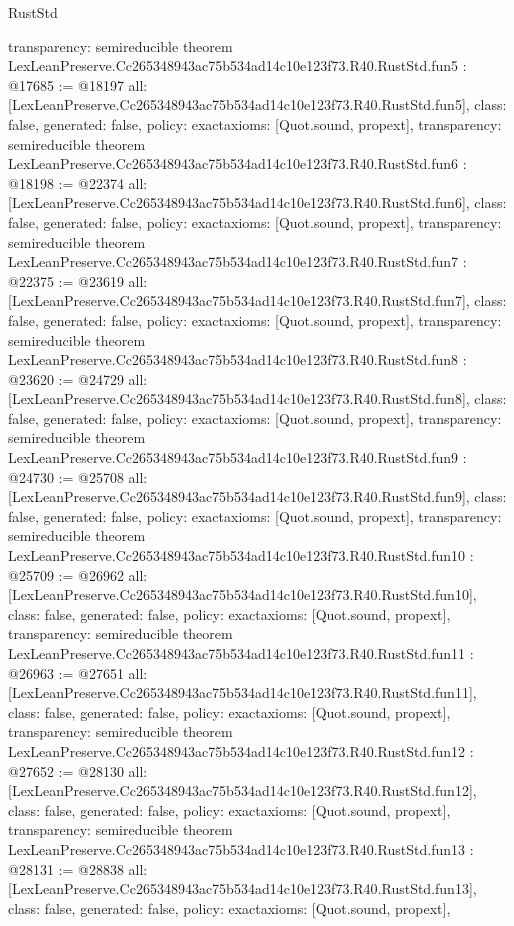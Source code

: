 \begin{lexlean}{RustStd}
\begin{coremodule}
{  transparency: semireducible
}
theorem LexLeanPreserve.Cc265348943ac75b534ad14c10e123f73.R40.RustStd.fun5 : @17685 := @18197 {
  all: [LexLeanPreserve.Cc265348943ac75b534ad14c10e123f73.R40.RustStd.fun5],
  class: false,
  generated: false,
  policy: exact{axioms: [Quot.sound, propext]},
  transparency: semireducible
}
theorem LexLeanPreserve.Cc265348943ac75b534ad14c10e123f73.R40.RustStd.fun6 : @18198 := @22374 {
  all: [LexLeanPreserve.Cc265348943ac75b534ad14c10e123f73.R40.RustStd.fun6],
  class: false,
  generated: false,
  policy: exact{axioms: [Quot.sound, propext]},
  transparency: semireducible
}
theorem LexLeanPreserve.Cc265348943ac75b534ad14c10e123f73.R40.RustStd.fun7 : @22375 := @23619 {
  all: [LexLeanPreserve.Cc265348943ac75b534ad14c10e123f73.R40.RustStd.fun7],
  class: false,
  generated: false,
  policy: exact{axioms: [Quot.sound, propext]},
  transparency: semireducible
}
theorem LexLeanPreserve.Cc265348943ac75b534ad14c10e123f73.R40.RustStd.fun8 : @23620 := @24729 {
  all: [LexLeanPreserve.Cc265348943ac75b534ad14c10e123f73.R40.RustStd.fun8],
  class: false,
  generated: false,
  policy: exact{axioms: [Quot.sound, propext]},
  transparency: semireducible
}
theorem LexLeanPreserve.Cc265348943ac75b534ad14c10e123f73.R40.RustStd.fun9 : @24730 := @25708 {
  all: [LexLeanPreserve.Cc265348943ac75b534ad14c10e123f73.R40.RustStd.fun9],
  class: false,
  generated: false,
  policy: exact{axioms: [Quot.sound, propext]},
  transparency: semireducible
}
theorem LexLeanPreserve.Cc265348943ac75b534ad14c10e123f73.R40.RustStd.fun10 : @25709 := @26962 {
  all: [LexLeanPreserve.Cc265348943ac75b534ad14c10e123f73.R40.RustStd.fun10],
  class: false,
  generated: false,
  policy: exact{axioms: [Quot.sound, propext]},
  transparency: semireducible
}
theorem LexLeanPreserve.Cc265348943ac75b534ad14c10e123f73.R40.RustStd.fun11 : @26963 := @27651 {
  all: [LexLeanPreserve.Cc265348943ac75b534ad14c10e123f73.R40.RustStd.fun11],
  class: false,
  generated: false,
  policy: exact{axioms: [Quot.sound, propext]},
  transparency: semireducible
}
theorem LexLeanPreserve.Cc265348943ac75b534ad14c10e123f73.R40.RustStd.fun12 : @27652 := @28130 {
  all: [LexLeanPreserve.Cc265348943ac75b534ad14c10e123f73.R40.RustStd.fun12],
  class: false,
  generated: false,
  policy: exact{axioms: [Quot.sound, propext]},
  transparency: semireducible
}
theorem LexLeanPreserve.Cc265348943ac75b534ad14c10e123f73.R40.RustStd.fun13 : @28131 := @28838 {
  all: [LexLeanPreserve.Cc265348943ac75b534ad14c10e123f73.R40.RustStd.fun13],
  class: false,
  generated: false,
  policy: exact{axioms: [Quot.sound, propext]},
}
\end{coremodule}
\end{lexlean}
